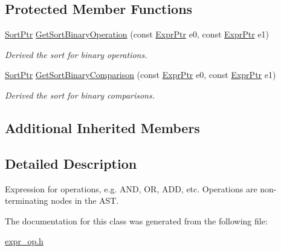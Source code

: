 \subsection*{Protected Member Functions}
\begin{DoxyCompactItemize}
\item 
\mbox{\label{classilang_1_1_expr_op_ac954bc8ce74a6b05a89200cc550c46bc}} 
\mbox{\hyperlink{namespaceilang_ae01073336878d60a231f4fe96d45ab55}{Sort\+Ptr}} \mbox{\hyperlink{classilang_1_1_expr_op_ac954bc8ce74a6b05a89200cc550c46bc}{Get\+Sort\+Binary\+Operation}} (const \mbox{\hyperlink{classilang_1_1_expr_a85952b6a34620c4c8cab6bac9c9fdf8c}{Expr\+Ptr}} e0, const \mbox{\hyperlink{classilang_1_1_expr_a85952b6a34620c4c8cab6bac9c9fdf8c}{Expr\+Ptr}} e1)
\begin{DoxyCompactList}\small\item\em Derived the sort for binary operations. \end{DoxyCompactList}\item 
\mbox{\label{classilang_1_1_expr_op_a15bfe08431fcbd48c149fd4a8454165c}} 
\mbox{\hyperlink{namespaceilang_ae01073336878d60a231f4fe96d45ab55}{Sort\+Ptr}} \mbox{\hyperlink{classilang_1_1_expr_op_a15bfe08431fcbd48c149fd4a8454165c}{Get\+Sort\+Binary\+Comparison}} (const \mbox{\hyperlink{classilang_1_1_expr_a85952b6a34620c4c8cab6bac9c9fdf8c}{Expr\+Ptr}} e0, const \mbox{\hyperlink{classilang_1_1_expr_a85952b6a34620c4c8cab6bac9c9fdf8c}{Expr\+Ptr}} e1)
\begin{DoxyCompactList}\small\item\em Derived the sort for binary comparisons. \end{DoxyCompactList}\end{DoxyCompactItemize}
\subsection*{Additional Inherited Members}


\subsection{Detailed Description}
Expression for operations, e.\+g. A\+ND, OR, A\+DD, etc. Operations are non-\/terminating nodes in the A\+ST. 

The documentation for this class was generated from the following file\+:\begin{DoxyCompactItemize}
\item 
\mbox{\hyperlink{expr__op_8h}{expr\+\_\+op.\+h}}\end{DoxyCompactItemize}
